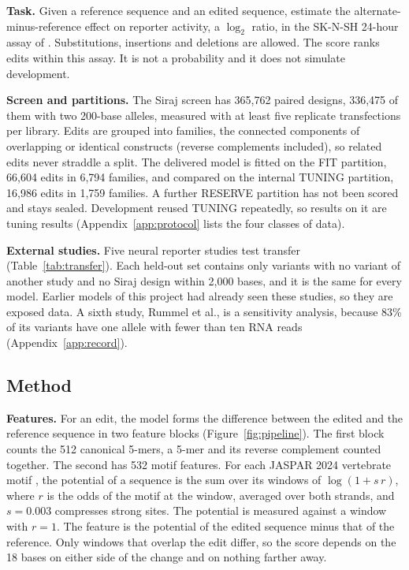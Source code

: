 \documentclass[10.5pt,a4paper]{article}
\begin{document}
\textbf{Task.} Given a reference sequence and an edited sequence, estimate the alternate-minus-reference effect on reporter activity, a $\log_2$ ratio, in the SK-N-SH 24-hour assay of \citet{siraj2026}. Substitutions, insertions and deletions are allowed. The score ranks edits within this assay. It is not a probability and it does not simulate development.

\textbf{Screen and partitions.} The Siraj screen has 365,762 paired designs, 336,475 of them with two 200-base alleles, measured with at least five replicate transfections per library. Edits are grouped into families, the connected components of overlapping or identical constructs (reverse complements included), so related edits never straddle a split. The delivered model is fitted on the FIT partition, 66,604 edits in 6,794 families, and compared on the internal TUNING partition, 16,986 edits in 1,759 families. A further RESERVE partition has not been scored and stays sealed. Development reused TUNING repeatedly, so results on it are tuning results (Appendix~\ref{app:protocol} lists the four classes of data).

\textbf{External studies.} Five neural reporter studies test transfer (Table~\ref{tab:transfer}). Each held-out set contains only variants with no variant of another study and no Siraj design within 2,000 bases, and it is the same for every model. Earlier models of this project had already seen these studies, so they are exposed data. A sixth study, Rummel et al., is a sensitivity analysis, because 83\% of its variants have one allele with fewer than ten RNA reads (Appendix~\ref{app:record}).

\subsection{Method}\label{sec:method}

\textbf{Features.} For an edit, the model forms the difference between the edited and the reference sequence in two feature blocks (Figure~\ref{fig:pipeline}). The first block counts the 512 canonical 5-mers, a 5-mer and its reverse complement counted together. The second has 532 motif features. For each JASPAR 2024 vertebrate motif \citep{rauluseviciute2024}, the potential of a sequence is the sum over its windows of $\log(1+s\,r)$, where $r$ is the odds of the motif at the window, averaged over both strands, and $s=0.003$ compresses strong sites. The potential is measured against a window with $r=1$. The feature is the potential of the edited sequence minus that of the reference. Only windows that overlap the edit differ, so the score depends on the 18 bases on either side of the change and on nothing farther away.
\end{document}
